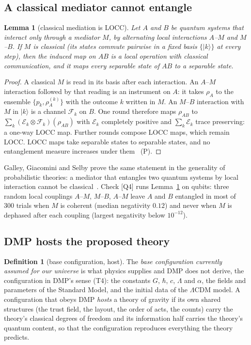 \documentclass[11pt,a4paper]{article}
\newtheorem{lemma}{Lemma}
\theoremstyle{definition}
\newtheorem{definition}{Definition}
\theoremstyle{remark}
\newcommand{\chk}[1]{\textsf{[#1]}}
\newcommand{\tagP}{\textsf{(P)}}
\newcommand{\ket}[1]{\lvert #1\rangle}
\theoremstyle{definition}
\begin{document}
\subsection{A classical mediator cannot entangle}

\begin{lemma}[classical mediation is LOCC]\label{lem:locc}
Let $A$ and $B$ be quantum systems that interact only through a mediator $M$, by alternating local interactions $A$--$M$ and $M$--$B$. If
$M$ is classical (its states commute pairwise in a fixed basis $\{\ket k\}$ at every step), then the induced map on $AB$ is a local
operation with classical communication, and it maps every separable state of $AB$ to a separable state.
\end{lemma}

\begin{proof}
A classical $M$ is read in its basis after each interaction. An $A$--$M$ interaction followed by that reading is an instrument on $A$: it
takes $\rho_A$ to the ensemble $\{p_k,\rho_A^{(k)}\}$ with the outcome $k$ written in $M$. An $M$--$B$ interaction with $M$ in $\ket k$ is a
channel $\mathcal F_k$ on $B$. One round therefore maps $\rho_{AB}$ to $\sum_k(\mathcal E_k\otimes\mathcal F_k)(\rho_{AB})$ with
$\mathcal E_k$ completely positive and $\sum_k\mathcal E_k$ trace preserving: a one-way LOCC map. Further rounds compose LOCC maps, which
remain LOCC. LOCC maps take separable states to separable states, and no entanglement measure increases under them~\cite{vw} \tagP.
\end{proof}

Galley, Giacomini and Selby prove the same statement in the generality of probabilistic theories: a mediator that entangles two quantum
systems by local interaction cannot be classical~\cite{ggs}. Check \chk{Q4} runs Lemma~\ref{lem:locc} on qubits: three random local
couplings $A$--$M$, $M$--$B$, $A$--$M$ leave $A$ and $B$ entangled in most of 300 trials when $M$ is coherent (median negativity $0.12$)
and never when $M$ is dephased after each coupling (largest negativity below $10^{-12}$).

\subsection{DMP hosts the proposed theory}

\begin{definition}[base configuration, host]\label{def:model}
The \emph{base configuration currently assumed for our universe} is what physics supplies and DMP does not derive, the configuration in
DMP's sense (T4): the constants $G$, $\hbar$, $c$, $\Lambda$ and $\alpha$, the fields and parameters of the Standard Model, and the initial
data of the $\Lambda$CDM model. A configuration that obeys DMP \emph{hosts} a theory of gravity if its own shared structures (the trust
field, the layout, the order of acts, the counts) carry the theory's classical degrees of freedom and its information half carries the
theory's quantum content, so that the configuration reproduces everything the theory predicts.
\end{definition}
\end{document}
